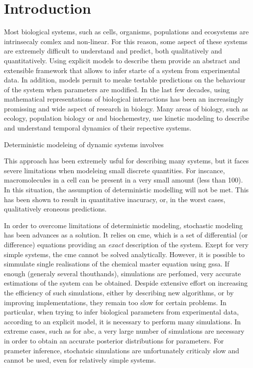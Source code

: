 \section{Introduction} \label{intro}


Most biological systems, such as cells, organisms, populations and ecosystems are intrinsecaly comlex and non-linear.
For this reason, some aspect of these systems are extremely difficult to understand and predict, both qualitatively and quantitatively.
Using explicit models to describe them provide an abstract and extensible framework that allows to infer starte of a system from experimental data. 
In addition, models permit to meake testable predictions on the behaviour of the system when parameters are modified.
In the last few decades, using mathematical representations of biological interactions has been an increasingly promissing and wide aspect of research in biology.
Many areas of biology, such as ecology, population biology or and biochemestry, use kinetic modeling to describe and understand temporal dynamics of their repective systems.

Deterministic modeleing of dynamic systems involves 

This approach has been extremely usful for describing many systems, but it faces severe limitations when modeleing small discrete quantities.
For inscance, macromolecules in a cell can be present in a very small amount (less than 100). 
In this situation, the assumption of deterministic modelling will not be met. 
This has been shown to result in quantitative inacuracy, or, in the worst cases, qualitatively eroneous predictions.


In order to overcome limitations of deterministic modeling, stochastic modeling has been advances as a solution.
It relies on \gls{cme}, which is a set of differential (or difference) equations providing an \emph{exact} description of the system.
Exept for very simple systems, the \gls{cme} cannot be solved analytically. 
However, it is possible to simmulate single realisations of the chemical master equation using \gls{gssa}.
If enough (generaly several thouthands), simulations are perfomed, very accurate estimations of the system can be obtained.
Despide extensive effort on increasing the efficiency of such simulations, either by describing new algorithms, or by improving implementations,
they remain too slow for certain problems. 
In particular, when trying to infer biological parameters from experimental data, according to an explicit model,
it is necessary to perform many simulations. 
In extreme cases, such as for \gls{abc}, a very large number of simulations are necessary in order to obtain an accurate posterior distributions for parameters.
For prameter inference, stochatsic simulations are unfortunately  criticaly slow and cannot be used, even for relatively simple systems.


